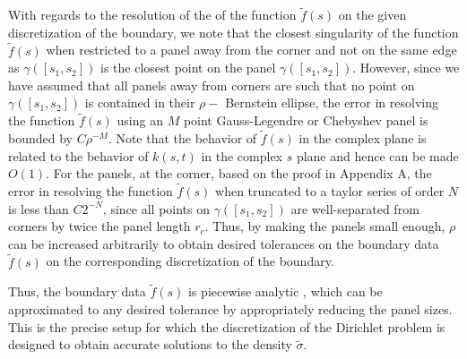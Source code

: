 \documentclass[12pt]{article}
\begin{document}
With regards to the resolution of the of the function $\tilde{f}(s)$ on the given discretization of the boundary, 
we note that the closest singularity of the function $\tilde{f}(s)$ when restricted to a panel away from the corner
and not on the same edge as $\gamma([s_{1},s_{2}])$ is the closest point on the panel $\gamma([s_{1},s_{2}])$. 
However, since we have assumed that all panels away from corners are such that no point on $\gamma([s_{1},s_{2}])$ 
is contained in their $\rho-$ Bernstein ellipse, the error in resolving the function $\tilde{f}(s)$ using an $M$ point Gauss-Legendre
or Chebyshev panel is bounded by $C \rho^{-M}$. Note that the behavior of $\tilde{f}(s)$ in the complex plane is related
to the behavior of $k(s,t)$ in the complex $s$ plane and hence can be made $O(1)$.
For the panels, at the corner, based on the proof in Appendix A, the error in resolving the function $\tilde{f}(s)$ when
truncated to a taylor series of order $N$ is less than $C 2^{-N}$, since all points on $\gamma([s_{1},s_{2}])$ are 
well-separated from corners by twice the panel length $r_{c}$. Thus, by making the panels small enough, $\rho$ can be increased arbitrarily to obtain desired tolerances on the boundary data $\tilde{f}(s)$ on the corresponding discretization of the boundary. 
 
 Thus, the boundary data $\tilde{f}(s)$ is piecewise analytic , which can be approximated to any desired tolerance by appropriately reducing the panel sizes. This is the precise setup for which the discretization of the Dirichlet problem is designed to obtain accurate solutions to the density $\tilde{\sigma}$. 
\end{document}
